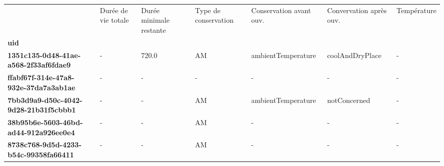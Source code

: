 \begin{tabularx}{\linewidth}{lXXXXXX}
\toprule
{} &  Durée de vie totale &  Durée minimale restante & Type de conservation & Conservation avant ouv. & Convervation après ouv. & Température \\
\textbf{uid                                 } &                      &                          &                      &                         &                         &             \\
\midrule
\textbf{1351c135-0d48-41ae-a568-2f33af6fdae9} &                    - &                    720.0 &                   AM &      ambientTemperature &         coolAndDryPlace &           - \\
\textbf{ffabf67f-314e-47a8-932e-37da7a3ab1ae} &                    - &                        - &                    - &                       - &                       - &           - \\
\textbf{7bb3d9a9-d50c-4042-9d28-21b31f5cbbb1} &                    - &                        - &                   AM &      ambientTemperature &            notConcerned &           - \\
\textbf{38b95b6e-5603-46bd-ad44-912a926ee0e4} &                    - &                        - &                   AM &                       - &                       - &           - \\
\textbf{8738c768-9d5d-4233-b54c-99358fa66411} &                    - &                        - &                   AM &                       - &                       - &           - \\
\bottomrule
\end{tabularx}
